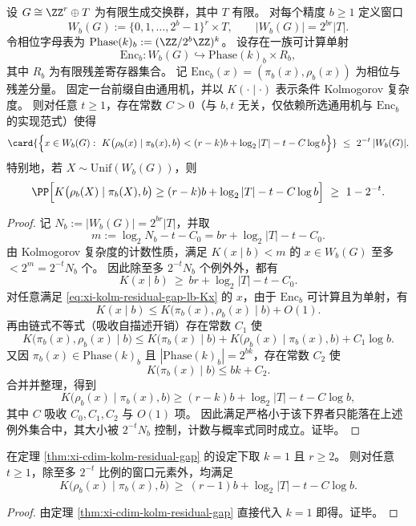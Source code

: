 \begin{theorem}\label{thm:xi-cdim-kolm-residual-gap}
设 \(G\cong \ZZ^{r}\oplus T\) 为有限生成交换群，其中 \(T\) 有限。
对每个精度 \(b\ge 1\) 定义窗口
\[
W_b(G):=\{0,1,\dots,2^b-1\}^{r}\times T,
\qquad
|W_b(G)|=2^{br}|T|.
\]
令相位字母表为 \(\mathrm{Phase}(k)_b:=(\ZZ/2^b\ZZ)^k\)。
设存在一族可计算单射
\[
\mathrm{Enc}_b:W_b(G)\hookrightarrow \mathrm{Phase}(k)_b\times R_b,
\]
其中 \(R_b\) 为有限残差寄存器集合。
记 \(\mathrm{Enc}_b(x)=(\pi_b(x),\rho_b(x))\) 为相位与残差分量。
固定一台前缀自由通用机，并以 \(K(\cdot\mid\cdot)\) 表示条件 Kolmogorov 复杂度。
则对任意 \(t\ge 1\)，存在常数 \(C>0\)（与 \(b,t\) 无关，仅依赖所选通用机与 \(\mathrm{Enc}_b\) 的实现范式）使得
\[
\card{\Bigl\{x\in W_b(G):\ K\bigl(\rho_b(x)\mid \pi_b(x),b\bigr)
<
(r-k)b+\log_2|T|-t-C\log b\Bigr\}}
\ \le\ 2^{-t}\,|W_b(G)|.
\]
特别地，若 \(X\sim\mathrm{Unif}(W_b(G))\)，则
\[
\PP\Bigl[
K\bigl(\rho_b(X)\mid \pi_b(X),b\bigr)
\ge
(r-k)b+\log_2|T|-t-C\log b
\Bigr]\ \ge\ 1-2^{-t}.
\]
\end{theorem}
\begin{proof}
记 \(N_b:=|W_b(G)|=2^{br}|T|\)，并取
\[
m:=\log_2 N_b-t-C_0
=br+\log_2|T|-t-C_0.
\]
由 Kolmogorov 复杂度的计数性质，满足 \(K(x\mid b)<m\) 的 \(x\in W_b(G)\) 至多 \(<2^m=2^{-t}N_b\) 个。
因此除至多 \(2^{-t}N_b\) 个例外外，都有
\begin{equation}\label{eq:xi-kolm-residual-gap-lb-Kx}
K(x\mid b)\ \ge\ br+\log_2|T|-t-C_0.
\end{equation}
对任意满足 \eqref{eq:xi-kolm-residual-gap-lb-Kx} 的 \(x\)，由于 \(\mathrm{Enc}_b\) 可计算且为单射，有
\[
K(x\mid b)\le K\bigl(\pi_b(x),\rho_b(x)\mid b\bigr)+O(1).
\]
再由链式不等式（吸收自描述开销）存在常数 \(C_1\) 使
\[
K\bigl(\pi_b(x),\rho_b(x)\mid b\bigr)
\le
K\bigl(\pi_b(x)\mid b\bigr)+K\bigl(\rho_b(x)\mid \pi_b(x),b\bigr)+C_1\log b.
\]
又因 \(\pi_b(x)\in \mathrm{Phase}(k)_b\) 且 \(|\mathrm{Phase}(k)_b|=2^{bk}\)，存在常数 \(C_2\) 使
\[
K\bigl(\pi_b(x)\mid b\bigr)\le bk+C_2.
\]
合并并整理，得到
\[
K\bigl(\rho_b(x)\mid \pi_b(x),b\bigr)
\ge
(r-k)b+\log_2|T|-t-C\log b,
\]
其中 \(C\) 吸收 \(C_0,C_1,C_2\) 与 \(O(1)\) 项。
因此满足严格小于该下界者只能落在上述例外集合中，其大小被 \(2^{-t}N_b\) 控制，计数与概率式同时成立。证毕。
\end{proof}

\begin{corollary}\label{cor:xi-cdim-kolm-single-phase}
在定理 \ref{thm:xi-cdim-kolm-residual-gap} 的设定下取 \(k=1\) 且 \(r\ge 2\)。
则对任意 \(t\ge 1\)，除至多 \(2^{-t}\) 比例的窗口元素外，均满足
\[
K\bigl(\rho_b(x)\mid \pi_b(x),b\bigr)\ \ge\ (r-1)b+\log_2|T|-t-C\log b.
\]
\end{corollary}
\begin{proof}
由定理 \ref{thm:xi-cdim-kolm-residual-gap} 直接代入 \(k=1\) 即得。证毕。
\end{proof}

